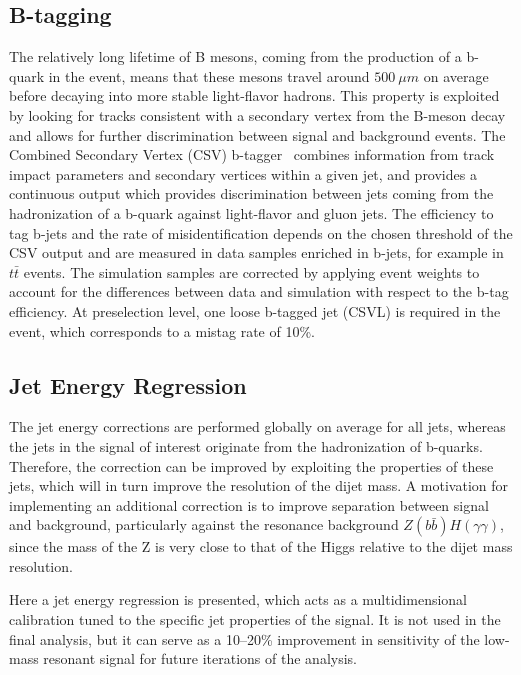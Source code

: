\subsection{B-tagging\label{subsec:btag}}

The relatively long lifetime of B mesons, coming from the production of a b-quark in the event,
means that these mesons travel around $500~\mu m$ on average before decaying into more stable
light-flavor hadrons.
This property is exploited by looking for tracks consistent with a secondary vertex from
the B-meson decay and allows for further discrimination between signal and background events.
The Combined Secondary Vertex (CSV) b-tagger~\cite{BTV} combines
information from track impact parameters and secondary vertices within a given jet, and
provides a continuous output which provides discrimination between jets coming from the
hadronization of a b-quark against light-flavor and gluon jets.
The efficiency to tag b-jets and the rate of misidentification depends on the chosen threshold
of the CSV output and are measured in data samples enriched in b-jets, for example in $t\bar{t}$ events.
The simulation samples are corrected by applying event weights to account for the
differences between data and simulation with respect to the b-tag efficiency.
At preselection level, one loose b-tagged jet (CSVL) is required in the event, which corresponds to
a mistag rate of 10\%.

\subsection{Jet Energy Regression}

The jet energy corrections are performed globally on average for all jets, whereas the jets in
the signal of interest originate from the hadronization of b-quarks. Therefore, the correction
can be improved by exploiting the properties of these jets, which will in turn improve the resolution
of the dijet mass. A motivation for implementing an additional correction is to improve separation
between signal and background, particularly against
the resonance background $Z(b\bar{b})H(\gamma\gamma)$,
since the mass of the Z is very close to that of the Higgs relative to the dijet mass resolution.

Here a jet energy regression is presented, which acts as a multidimensional calibration tuned to the
specific jet properties of the signal. It is not used in the final analysis, but it can serve
as a 10--20\% improvement in sensitivity of the low-mass resonant signal
for future iterations of the analysis.

